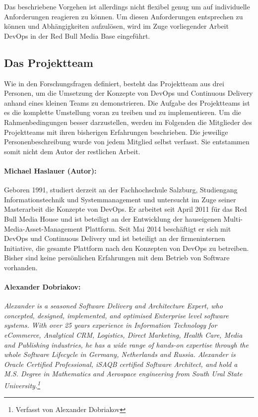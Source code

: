 Das beschriebene Vorgehen ist allerdings nicht flexibel genug um auf individuelle Anforderungen reagieren zu können. Um diesen Anforderungen entsprechen zu können und Abhängigkeiten aufzulösen, wird im Zuge vorliegender Arbeit DevOps in der Red Bull Media Base eingeführt.

\subsection{Das Projektteam}
\label{sec:team}
Wie in den Forschungsfragen definiert, besteht das Projektteam aus drei Personen, um die Umsetzung der Konzepte von DevOps und Continuous Delivery anhand eines kleinen Teams zu demonstrieren. Die Aufgabe des Projektteams ist es die komplette Umstellung voran zu treiben und zu implementieren. Um die Rahmenbedingungen besser darzustellen, werden im Folgenden die Mitglieder des Projektteams mit ihren bisherigen Erfahrungen beschrieben. Die jeweilige Personenbeschreibung wurde von jedem Mitglied selbst verfasst. Sie entstammen somit nicht dem Autor der restlichen Arbeit.

\paragraph{Michael Haslauer (Autor):} Geboren 1991, studiert derzeit an der Fachhochschule Salzburg, Studiengang Informationstechnik und Systemmanagement und untersucht im Zuge seiner Masterarbeit die Konzepte von DevOps. Er arbeitet seit April 2011 für das Red Bull Media House und ist beteiligt an der Entwicklung der hauseigenen Multi-Media-Asset-Management Plattform. Seit Mai 2014 beschäftigt er sich mit DevOps und Continuous Delivery und ist beteiligt an der firmeninternen Initiative, die gesamte Plattform nach den Konzepten von DevOps zu betreiben. Bisher sind keine persönlichen Erfahrungen mit dem Betrieb von Software vorhanden.

\paragraph{Alexander Dobriakov:} \textit{Alexander is a seasoned Software Delivery and Architecture Expert, who concepted, designed, implemented, and optimised Enterprise level software systems. With over 25 years experience in Information Technology for eCommerce, Analytical CRM, Logistics, Direct Marketing, Health Care, Media and Publishing industries, he has a wide range of hands-on expertise through the whole Software Lifecycle in Germany, Netherlands and Russia. Alexander is Oracle Certified Professional, iSAQB certified Software Architect, and hold a M.S. Degree in Mathematics and Aerospace engineering from South Ural State University.\footnote{Verfasst von Alexander Dobriakov}}

